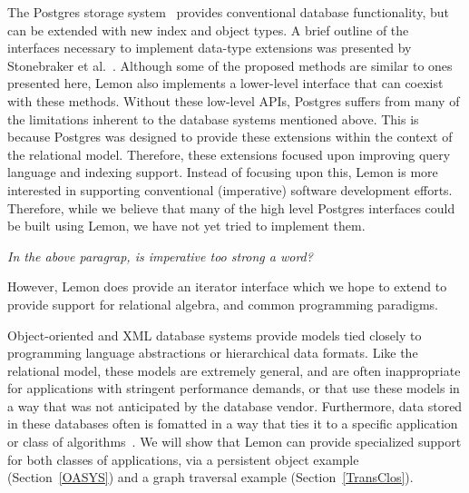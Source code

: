 \documentclass[letterpaper,twocolumn,english]{article}
\newcommand{\yad}{Lemon\xspace}
\begin{document}
The Postgres storage system~\cite{postgres} provides conventional
database functionality, but can be extended with new index and object
types.  A brief outline of the interfaces necessary to implement data-type extensions was presented by Stonebraker et al.~\cite{newTypes}.
Although some of the proposed methods are similar to ones presented
here, \yad also implements a lower-level interface that can coexist
with these methods.  Without these low-level APIs, Postgres
suffers from many of the limitations inherent to the database systems
mentioned above.  This is because Postgres was designed to provide 
these extensions within the context of the relational model.  
Therefore, these extensions focused upon improving query language 
and indexing support.  Instead of focusing upon this, \yad is more 
interested in supporting conventional (imperative) software development
efforts.  Therefore, while we believe that many of the high level 
Postgres interfaces could be built using \yad, we have not yet tried 
to implement them.

{\em In the above paragrap, is imperative too strong a word?}


However, \yad does provide an iterator interface which we hope to
extend to provide support for relational algebra, and common
programming paradigms.

Object-oriented and XML database systems provide models tied closely
to programming language abstractions or hierarchical data formats.
Like the relational model, these models are extremely general, and are
often inappropriate for applications with stringent performance
demands, or that use these models in a way that was not anticipated by
the database vendor.  Furthermore, data stored in these databases
often is fomatted in a way that ties it to a specific application or
class of algorithms~\cite{lamb}.  We will show that \yad can provide 
specialized support for both classes of applications, via a persistent 
object example (Section~\ref{OASYS}) and a graph traversal example 
(Section~\ref{TransClos}).

\end{document}
